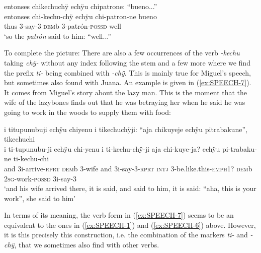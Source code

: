 \ea\label{ex:SPEECH-6}
\begingl
\glpreamble entonses chikechuchÿ echÿu chipatrone: “bueno...”\\
\gla entonses chi-kechu-chÿ echÿu chi-patron-ne bueno\\
\glb thus 3-say-3 \textsc{dem}b 3-patrón-\textsc{possd} well\\
\glft ‘so the \textit{patrón} said to him: “well...”
\endgl
\trailingcitation{[mxx-p110825l.026]}
\xe

To complete the picture: There are also a few occurrences of the verb \textit{-kechu} taking \textit{chÿ-} without any index following the stem and a few more where we find the prefix \textit{ti-} being combined with \textit{-chÿ}. This is mainly true for Miguel’s speech, but sometimes also found with Juana. An example is given in (\ref{ex:SPEECH-7}). It comes from Miguel’s story about the lazy man. This is the moment that the wife of the lazybones finds out that he was betraying her when he said he was going to work in the woods to supply them with food:

\ea\label{ex:SPEECH-7}
\begingl
\glpreamble i titupunubuji echÿu chiyenu i tikechuchÿji: “aja chikuyeje echÿu pitrabakune”, tikechuchi\\
\gla i ti-tupunubu-ji echÿu chi-yenu i ti-kechu-chÿ-ji aja chi-kuye-ja? echÿu pi-trabaku-ne ti-kechu-chi\\
\glb and 3i-arrive-\textsc{rprt} \textsc{dem}b 3-wife and 3i-say-3-\textsc{rprt} \textsc{intj} 3-be.like.this-\textsc{emph}1? \textsc{dem}b 2\textsc{sg}-work-\textsc{possd} 3i-say-3\\
\glft ‘and his wife arrived there, it is said, and said to him, it is said: “aha, this is your work”, she said to him’
\endgl
\trailingcitation{[mox-n110920l.071-072]}
\xe

In terms of its meaning, the verb form in (\ref{ex:SPEECH-7}) seems to be an equivalent to the ones in (\ref{ex:SPEECH-1}) and (\ref{ex:SPEECH-6}) above. However, it is this precisely this construction, i.e. the combination of the markers \textit{ti-} and \textit{-chÿ}, that we sometimes also find with other verbs.

%


